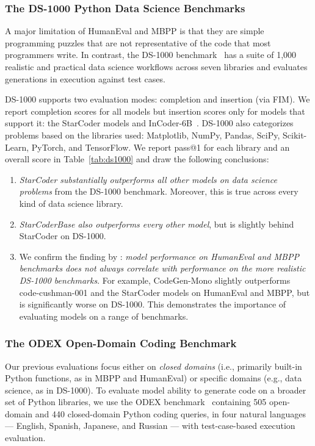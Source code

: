 \subsubsection{The DS-1000 Python Data Science Benchmarks}

A major limitation of HumanEval and MBPP is that they are simple programming puzzles that are not representative of the code that most programmers write. In contrast, the DS-1000 benchmark~\citep{Lai2022DS1000} has a suite of 1,000 realistic and practical data science workflows across seven libraries and evaluates generations in execution against test cases.

DS-1000 supports two evaluation modes: completion and insertion (via FIM). We report completion scores for all models but insertion scores only for models that support it: the StarCoder models and InCoder-6B~\citep{fried2022incoder}. DS-1000 also categorizes problems based on the libraries used: Matplotlib, NumPy, Pandas, SciPy, Scikit-Learn, PyTorch, and TensorFlow.  We report pass@1 for each library and an overall score in
Table~\ref{tab:ds1000} and draw the following conclusions:

\begin{enumerate}

  \item \emph{StarCoder substantially outperforms all other models on data science problems} from the DS-1000 benchmark. Moreover, this is true across every kind of data science library.

  \item \emph{StarCoderBase also outperforms every other model}, but is slightly behind StarCoder on DS-1000.

  \item We confirm the finding by \citet{Lai2022DS1000}: \emph{model performance on HumanEval and MBPP benchmarks does not always correlate with performance on the more realistic DS-1000 benchmarks}. For example, CodeGen-Mono slightly outperforms code-cushman-001 and the StarCoder models on HumanEval and MBPP, but is significantly worse on DS-1000. This demonstrates the importance of evaluating models on a range of benchmarks.

\end{enumerate}

\subsubsection{The ODEX Open-Domain Coding Benchmark} Our previous evaluations focus either on \emph{closed domains} (i.e., primarily built-in Python functions, as in MBPP and HumanEval) or specific domains (e.g., data science, as in DS-1000). To evaluate model ability to generate code on a broader set of Python libraries, we use the ODEX benchmark~\citep{wang2022execution} containing 505 open-domain and 440 closed-domain Python coding queries, in four natural languages --- English, Spanish, Japanese, and Russian --- with test-case-based execution evaluation.

